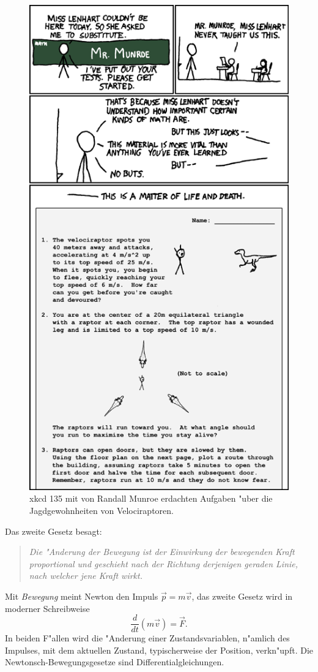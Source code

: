 \begin{figure}
\centering
\includegraphics[width=0.7\hsize]{chapters/substitute.png}
\caption{xkcd 135 mit von Randall Munroe erdachten Aufgaben "uber die
Jagdgewohnheiten von Velociraptoren.
\label{einleitung:xkcd135}}
\end{figure}%


Das zweite Gesetz besagt:
\begin{quote}
\em
Die "Anderung der Bewegung ist der Einwirkung der bewegenden Kraft
proportional und geschieht nach der Richtung derjenigen geraden Linie,
nach welcher jene Kraft wirkt.
\end{quote}
Mit {\em Bewegung}
meint Newton den Impuls $\vec{p}=m\vec{v}$,
das zweite Gesetz wird in moderner Schreibweise
\[
\frac{d}{dt}(m\vec{v}) = \vec{F}.
\]
In beiden F"allen wird die "Anderung einer Zustandsvariablen, n"amlich
des Impulses, mit dem aktuellen Zustand, typischerweise der Position,
verkn"upft.
Die Newtonsch-Bewegungsgesetze sind Differentialgleichungen.


